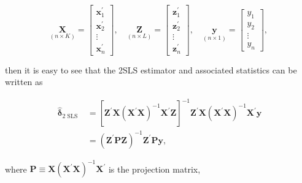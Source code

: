 \documentclass[10pt]{article}
\begin{document}
$$
\underset{(n \times K)}{\mathbf{X}}=\left[\begin{array}{c}
\mathbf{x}_{1}^{\prime} \\
\mathbf{x}_{2}^{\prime} \\
\vdots \\
\mathbf{x}_{n}^{\prime}
\end{array}\right], \quad \underset{(n \times L)}{\mathbf{Z}}=\left[\begin{array}{c}
\mathbf{z}_{1}^{\prime} \\
\mathbf{z}_{2}^{\prime} \\
\vdots \\
\mathbf{z}_{n}^{\prime}
\end{array}\right], \quad \underset{(n \times 1)}{\mathbf{y}}=\left[\begin{array}{c}
y_{1} \\
y_{2} \\
\vdots \\
y_{n}
\end{array}\right] \text {, }
$$

then it is easy to see that the 2SLS estimator and associated statistics can be written as


\begin{align*}
\hat{\boldsymbol{\delta}}_{2 \text { SLS }} & =\left[\mathbf{Z}^{\prime} \mathbf{X}\left(\mathbf{X}^{\prime} \mathbf{X}\right)^{-1} \mathbf{X}^{\prime} \mathbf{Z}\right]^{-1} \mathbf{Z}^{\prime} \mathbf{X}\left(\mathbf{X}^{\prime} \mathbf{X}\right)^{-1} \mathbf{X}^{\prime} \mathbf{y} \\
& =\left(\mathbf{Z}^{\prime} \mathbf{P} \mathbf{Z}\right)^{-1} \mathbf{Z}^{\prime} \mathbf{P} \mathbf{y}, \tag{$\prime$}
\end{align*}


where $\mathbf{P} \equiv \mathbf{X}\left(\mathbf{X}^{\prime} \mathbf{X}\right)^{-1} \mathbf{X}^{\prime}$ is the projection matrix,
\end{document}

